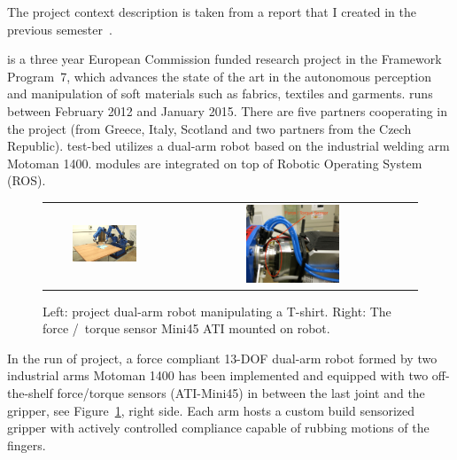         The project context description is taken from a report that I created in the previous semester~\cite{PreDiplomaLejsekHlavac}.


        \CloPeMa\/ is a three year European Commission funded research project in the Framework Program~7, which advances the state of the art in the autonomous perception and manipulation of soft materials such as fabrics, textiles and garments. \CloPeMa\/ runs  between February 2012 and January 2015. There are five partners cooperating in the project (from Greece, Italy, Scotland and two partners from the Czech Republic). \CloPeMa\/ test-bed utilizes a dual-arm robot based on the industrial welding arm Motoman 1400. \CloPeMa\/ modules are integrated on top of Robotic Operating System (ROS).

        \begin{figure}[h]
        \centering
        \begin{tabular}{cc}
        \includegraphics[width=0.57\textwidth]{tshirt02.png}
        &
        \includegraphics[width=0.39\textwidth]{CloPeMaForceTorqueSensorSmAnnotatedCrop.jpeg}
        \end{tabular}
        \caption{Left: \CloPeMa\/ project dual-arm robot manipulating a T-shirt. Right: The force /~torque sensor Mini45 ATI mounted on \CloPeMa\/ robot.}
        \label{fig:CloPeMaRobot-and-FTsensor}
        \end{figure}

        In the run of \CloPeMa\/ project, a force compliant 13-DOF dual-arm robot formed by two industrial arms Motoman 1400 has been implemented and equipped with two off-the-shelf force/torque sensors (ATI-Mini45) in between the last joint and the gripper, see Figure~\ref{fig:CloPeMaRobot-and-FTsensor}, right side. Each arm hosts a custom build sensorized gripper with actively controlled compliance capable of rubbing motions of the fingers.

